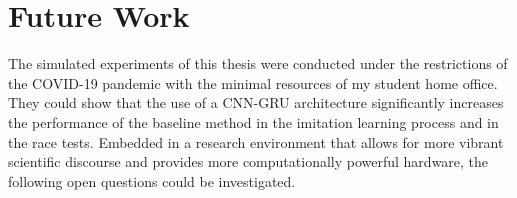 







\section{Future Work}
The simulated experiments of this thesis were conducted under the restrictions of the COVID-19 pandemic 
with the minimal resources of my student home office.
They could show that the use of a CNN-GRU architecture
significantly increases the performance of the baseline method 
in the imitation learning process and in the race tests.
Embedded in a research environment that allows for more vibrant scientific discourse 
and provides more computationally powerful hardware, 
the following open questions could be investigated.


